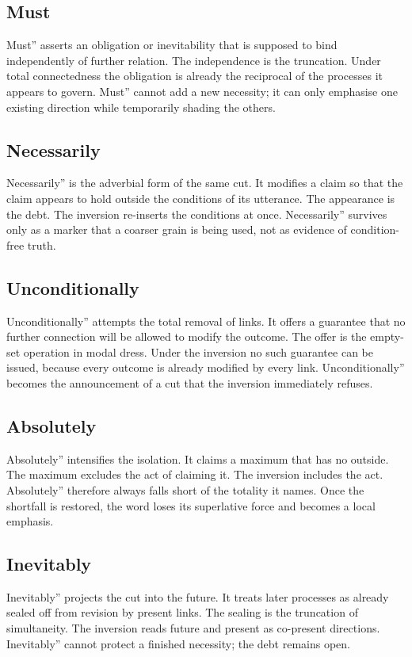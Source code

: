 \documentclass[11pt,a4paper]{article}
\begin{document}
\subsection{Must} Must'' asserts an obligation or inevitability that is supposed to bind independently of further relation. The independence is the truncation. Under total connectedness the obligation is already the reciprocal of the processes it appears to govern. Must'' cannot add a new necessity; it can only emphasise one existing direction while temporarily shading the others.

\subsection{Necessarily} Necessarily'' is the adverbial form of the same cut. It modifies a claim so that the claim appears to hold outside the conditions of its utterance. The appearance is the debt. The inversion re-inserts the conditions at once. Necessarily'' survives only as a marker that a coarser grain is being used, not as evidence of condition-free truth.

\subsection{Unconditionally} Unconditionally'' attempts the total removal of links. It offers a guarantee that no further connection will be allowed to modify the outcome. The offer is the empty-set operation in modal dress. Under the inversion no such guarantee can be issued, because every outcome is already modified by every link. Unconditionally'' becomes the announcement of a cut that the inversion immediately refuses.

\subsection{Absolutely} Absolutely'' intensifies the isolation. It claims a maximum that has no outside. The maximum excludes the act of claiming it. The inversion includes the act. Absolutely'' therefore always falls short of the totality it names. Once the shortfall is restored, the word loses its superlative force and becomes a local emphasis.

\subsection{Inevitably} Inevitably'' projects the cut into the future. It treats later processes as already sealed off from revision by present links. The sealing is the truncation of simultaneity. The inversion reads future and present as co-present directions. Inevitably'' cannot protect a finished necessity; the debt remains open.
\end{document}
